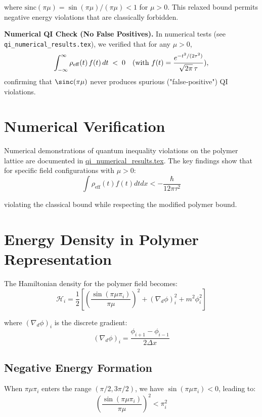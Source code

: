 \documentclass[12pt]{article}
\begin{document}
where $\mathrm{sinc}(\pi\mu) = \sin(\pi\mu)/(\pi\mu) < 1$ for $\mu > 0$. This relaxed bound permits negative energy violations that are classically forbidden.

\medskip
\noindent\textbf{Numerical QI Check (No False Positives).}
In numerical tests (see \texttt{qi\_numerical\_results.tex}), we verified that for any $\mu>0$,
\[
  \int_{-\infty}^{\infty} \rho_{\rm eff}(t)\,f(t)\,dt \;<\; 0
  \quad\text{(with }f(t)=\frac{e^{-t^2/(2\tau^2)}}{\sqrt{2\pi}\,\tau}\text{)},
\]
confirming that $\sinc(\pi\mu)$ never produces spurious ("false‐positive") QI violations.

\section{Numerical Verification}

Numerical demonstrations of quantum inequality violations on the polymer lattice are documented in \href{file:qi_numerical_results.tex}{qi\_numerical\_results.tex}. The key findings show that for specific field configurations with $\mu > 0$:
\begin{equation}
\int \rho_{\text{eff}}(t) f(t) dt dx < -\frac{\hbar}{12\pi\tau^2}
\end{equation}

violating the classical bound while respecting the modified polymer bound.

\section{Energy Density in Polymer Representation}

The Hamiltonian density for the polymer field becomes:
\begin{equation}
\mathcal{H}_i = \frac{1}{2}\left[ \left(\frac{\sin(\pi\mu \pi_i)}{\pi\mu}\right)^2 + (\nabla_d \phi)_i^2 + m^2 \phi_i^2 \right]
\end{equation}

where $(\nabla_d \phi)_i$ is the discrete gradient:
\begin{equation}
(\nabla_d \phi)_i = \frac{\phi_{i+1} - \phi_{i-1}}{2\Delta x}
\end{equation}

\subsection{Negative Energy Formation}

When $\pi\mu \pi_i$ enters the range $(\pi/2, 3\pi/2)$, we have $\sin(\pi\mu \pi_i) < 0$, leading to:
\begin{equation}
\left(\frac{\sin(\pi\mu \pi_i)}{\pi\mu}\right)^2 < \pi_i^2
\end{equation}
\end{document}
